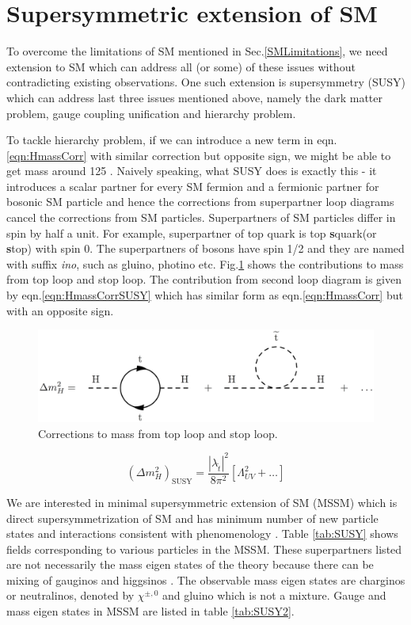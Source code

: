 \section{Supersymmetric extension of SM}
To overcome the limitations of SM mentioned in Sec.\ref{SMLimitations}, we need extension to SM which can address all (or some) of these issues without contradicting existing observations. One such extension is supersymmetry (SUSY) which can address last three issues mentioned above, namely the dark matter problem, gauge coupling unification and hierarchy problem.

To tackle hierarchy problem, if we can introduce a new term in eqn.\ref{eqn:HmassCorr} with similar correction but opposite sign, we might be able to get \higgs mass around 125 \gev. Naively speaking, what SUSY does is exactly this - it introduces a scalar partner for every SM fermion and a fermionic partner for bosonic SM particle and hence the corrections from superpartner loop diagrams cancel the corrections from SM particles. Superpartners of SM particles differ in spin by half a unit. For example, superpartner of top quark is top \textbf{s}quark(or \textbf{s}top) with spin 0. The superpartners of bosons have spin 1/2 and they are named with suffix \textit{ino}, such as gluino, photino etc. Fig.\ref{fig:hierarchy_problem_higgs_mass_stop} shows the contributions to \higgs mass from top loop and stop loop. The contribution from second loop diagram is given by eqn.\ref{eqn:HmassCorrSUSY} which has similar form as eqn.\ref{eqn:HmassCorr} but with an opposite sign.
\begin{figure}[h!]
\centering
\includegraphics[width=0.8\linewidth]{../Figures/hierarchy_problem_higgs_mass_stop}
\caption{Corrections to \higgs mass from top loop and stop loop.}
\label{fig:hierarchy_problem_higgs_mass_stop}
\end{figure}
\begin{equation}
(\Delta m_{H}^2)_{\text{SUSY}} = \frac{|\lambda_{\tilde{t}}|^2}{8\pi^2}[\Lambda_{UV}^2 + \dots]
\label{eqn:HmassCorrSUSY}
\end{equation}

We are interested in minimal supersymmetric extension of SM (MSSM) which is direct supersymmetrization of SM and has minimum number of new particle states and interactions consistent with phenomenology \cite{baer_tata_2006}. Table \ref{tab:SUSY} shows fields corresponding to various particles in the MSSM. These superpartners listed are not necessarily the mass eigen states of the theory because there can be mixing of gauginos and higgsinos \cite{Martin:1997ns}. The observable mass eigen states are charginos or neutralinos, denoted by $\chi^{\pm,0}$ and gluino which is not a mixture. Gauge and mass eigen states in MSSM are listed in table \ref{tab:SUSY2}.


